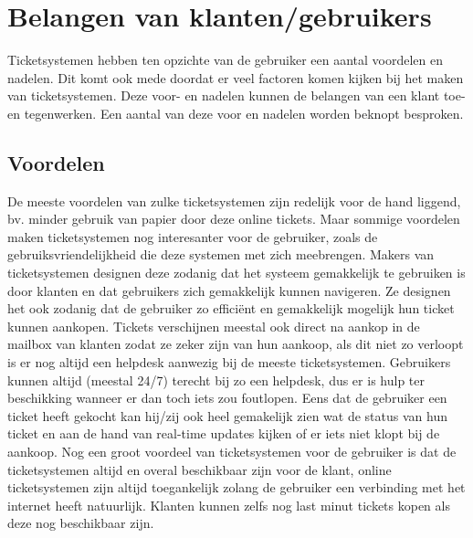 
\section{Belangen van klanten/gebruikers}
Ticketsystemen hebben ten opzichte van de gebruiker een aantal voordelen en nadelen. Dit komt ook mede doordat er veel factoren komen kijken bij het maken van ticketsystemen. 
Deze voor- en nadelen kunnen de belangen van een klant toe- en tegenwerken. Een aantal van deze voor en nadelen worden beknopt besproken. 

\subsection{Voordelen}
De meeste voordelen van zulke ticketsystemen zijn redelijk voor de hand liggend, bv. minder gebruik van papier door deze online tickets.
Maar sommige voordelen maken ticketsystemen nog interesanter voor de gebruiker, zoals de gebruiksvriendelijkheid die deze systemen met zich meebrengen.
Makers van ticketsystemen designen deze zodanig dat het systeem gemakkelijk te gebruiken is door klanten en dat gebruikers zich gemakkelijk kunnen navigeren.
Ze designen het ook zodanig dat de gebruiker zo efficiënt en gemakkelijk mogelijk hun ticket kunnen aankopen. Tickets verschijnen meestal ook direct na aankop 
in de mailbox van klanten zodat ze zeker zijn van hun aankoop, als dit niet zo verloopt is er nog altijd een helpdesk aanwezig bij de meeste ticketsystemen. 
Gebruikers kunnen altijd (meestal 24/7) terecht bij zo een helpdesk, dus er is hulp ter beschikking wanneer er dan toch iets zou foutlopen.
Eens dat de gebruiker een ticket heeft gekocht kan hij/zij ook heel gemakelijk zien wat de status van hun ticket en aan de hand van real-time updates kijken of er iets niet klopt bij de aankoop.
Nog een groot voordeel van ticketsystemen voor de gebruiker is dat de ticketsystemen altijd en overal beschikbaar zijn voor de klant,
online ticketsystemen zijn altijd toegankelijk zolang de gebruiker een verbinding met het internet heeft natuurlijk. 
Klanten kunnen zelfs nog last minut tickets kopen als deze nog beschikbaar zijn.


